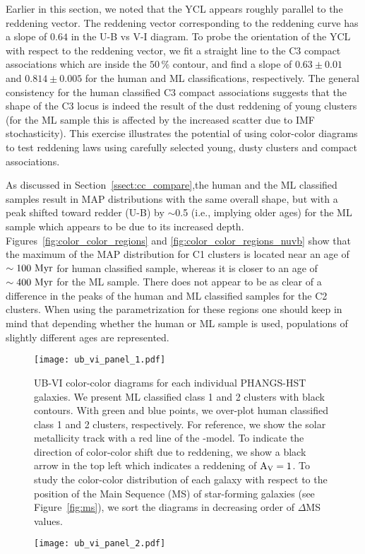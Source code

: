 \documentclass[]{aastex631}
\begin{document}
Earlier in this section, we noted that the YCL appears roughly parallel to the reddening vector. The reddening vector corresponding to the \citet{cardelli_relationship_1989} reddening curve has a slope of $0.64$ in the U-B vs V-I diagram.
To probe the orientation of the YCL with respect to the reddening vector, we fit a straight line to the C3 compact associations which are inside the $50\,\%$ contour, and find a slope of $0.63\pm0.01$ and $0.814\pm0.005$ for the human and ML classifications, respectively. 
The general consistency for the human classified C3 compact associations suggests that the shape of the C3 locus is indeed the result of the dust reddening of young clusters (for the ML sample this is affected by the increased scatter due to IMF stochasticity). This exercise illustrates the potential of using color-color diagrams to test reddening laws using carefully selected young, dusty clusters and compact associations. 

As discussed in Section~\ref{ssect:cc_compare},the human and the ML classified samples result in MAP distributions with the same overall shape, but with a peak shifted toward redder (U-B) by $\sim$0.5 (i.e., implying older ages) for the ML sample which appears to be due to its increased depth. Figures~\ref{fig:color_color_regions} and \ref{fig:color_color_regions_nuvb} show that the maximum of the MAP distribution for C1 clusters is located near an age of ${\rm \sim 100~Myr}$ for human classified sample, whereas it is closer to an age of ${\rm \sim 400~Myr}$ for the ML sample.  There does not appear to be as clear of a difference in the peaks of the human and ML classified samples for the C2 clusters.  When using the parametrization for these regions  one should keep in mind that depending whether the human or ML sample is used, populations of slightly different ages are represented.

\begin{figure*}[h]
\texttt{[image: ub\_vi\_panel\_1.pdf]}
 \caption{UB-VI color-color diagrams for each individual PHANGS-HST galaxies. We present ML classified class 1 and 2 clusters with black contours. With green and blue points, we over-plot human classified class 1 and 2 clusters, respectively. For reference, we show the solar metallicity track with a red line of the -model. To indicate the direction of color-color shift due to reddening, we show a black arrow in the top left which indicates a reddening of ${\rm A_{V} = 1}$. To study the color-color distribution of each galaxy with respect to the position of the Main Sequence (MS) of star-forming galaxies (see Figure~\ref{fig:ms}), we sort the diagrams in decreasing order of $\Delta$MS values.}
 \label{fig:ub_vi_1}
\end{figure*}
%
\begin{figure*}[h]
\texttt{[image: ub\_vi\_panel\_2.pdf]}
\end{figure*}
\end{document}
